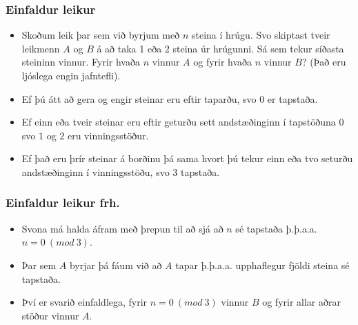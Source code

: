 \documentclass{beamer}
\begin{document}
\begin{frame}
\frametitle{Einfaldur leikur}

\begin{itemize}

\item<1-> Skoðum leik þar sem við byrjum með $n$ steina í hrúgu. Svo skiptast tveir leikmenn $A$ og $B$ á að taka 1 eða 2 steina úr hrúgunni. Sá sem tekur síðasta steininn vinnur. Fyrir hvaða $n$ vinnur $A$ og fyrir hvaða $n$ vinnur $B$? (Það eru ljóslega engin jafntefli).

\item<2-> Ef þú átt að gera og engir steinar eru eftir taparðu, svo $0$ er tapstaða.

\item<3-> Ef einn eða tveir steinar eru eftir geturðu sett andstæðinginn í tapstöðuna $0$ svo $1$ og $2$ eru vinningsstöður. 

\item<4-> Ef það eru þrír steinar á borðinu þá sama hvort þú tekur einn eða tvo seturðu andstæðinginn í vinningsstöðu, svo $3$ tapstaða.

\end{itemize}

\end{frame}

\begin{frame}
\frametitle{Einfaldur leikur frh.}

\begin{itemize}

\item<1-> Svona má halda áfram með þrepun til að sjá að $n$ sé tapstaða þ.þ.a.a. $n = 0 \ (mod \ 3)$.

\item<2-> Þar sem $A$ byrjar þá fáum við að $A$ tapar þ.þ.a.a. upphaflegur fjöldi steina sé tapstaða.

\item<3-> Því er svarið einfaldlega, fyrir $n = 0 \ (mod \ 3)$ vinnur $B$ og fyrir allar aðrar stöður vinnur $A$.

\end{itemize}

\end{frame}
\end{document}
